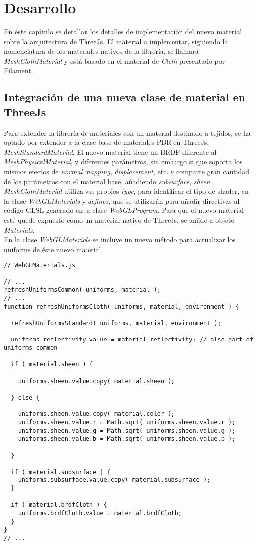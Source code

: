 \chapter{Desarrollo}

En \'este cap\'itulo se detallan los detalles de implementaci\'on del nuevo material sobre la arquitectura de ThreeJs.
El material a implementar, siguiendo la nomenclatura de los materiales nativos de la librer\'ia, se llamar\'a
\textit{MeshClothMaterial} y est\'a basado en el material de \textit{Cloth} presentado por Filament.

\section{Integraci\'on de una nueva clase de material en ThreeJs}
Para extender la librer\'ia de materiales con un material destinado a tejidos, se ha optado por extender a la clase base
de materiales PBR en ThreeJs, \textit{MeshStandardMaterial}. El nuevo material tiene un BRDF diferente al \textit{MeshPhysicalMaterial},
y diferentes par\'ametros, sin embargo si que soporta los mismos efectos de \textit{normal mapping}, \textit{displacement}, etc.
y comparte gran cantidad de los par\'ametros con el material base, a\~nadiendo \textit{subsurface}, \textit{sheen}.
\textit{MeshClothMaterial} utiliza sus propios \textit{type}, para identificar el tipo
de shader, en la clase \textit{WebGLMaterials} y \textit{defines}, que se utilizar\'an para a\~nadir directivas al c\'odigo GLSL
generado en la clase \textit{WebGLProgram}. Para que el nuevo material est\'e quede expuesto como un material nativo de ThreeJs,
se an\~ade a objeto \textit{Materials}.\\
En la clase \textit{WebGLMaterials} se incluye un nuevo m\'etodo para actualizar los uniforms de \'este nuevo material.

\singlespacing
\begin{lstlisting}[caption=Cambios sobre la clase WebGLMaterials de ThreeJs]
// WebGLMaterials.js

// ...
refreshUniformsCommon( uniforms, material );
// ...
function refreshUniformsCloth( uniforms, material, environment ) {

  refreshUniformsStandard( uniforms, material, environment );

  uniforms.reflectivity.value = material.reflectivity; // also part of uniforms common

  if ( material.sheen ) {

    uniforms.sheen.value.copy( material.sheen );

  } else {

    uniforms.sheen.value.copy( material.color );
    uniforms.sheen.value.r = Math.sqrt( uniforms.sheen.value.r );
    uniforms.sheen.value.g = Math.sqrt( uniforms.sheen.value.g );
    uniforms.sheen.value.b = Math.sqrt( uniforms.sheen.value.b );

  }

  if ( material.subsurface ) {
    uniforms.subsurface.value.copy( material.subsurface );
  }

  if ( material.brdfCloth ) {
    uniforms.brdfCloth.value = material.brdfCloth;
  }
}
// ...
\end{lstlisting}
\singlespacing

